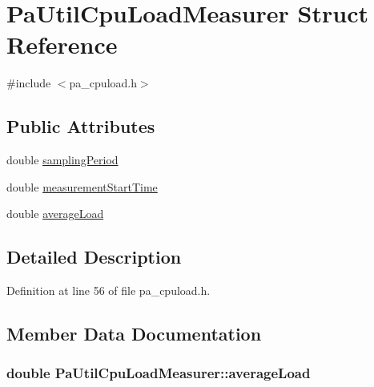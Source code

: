\hypertarget{struct_pa_util_cpu_load_measurer}{}\section{Pa\+Util\+Cpu\+Load\+Measurer Struct Reference}
\label{struct_pa_util_cpu_load_measurer}


{\ttfamily \#include $<$pa\+\_\+cpuload.\+h$>$}

\subsection*{Public Attributes}
\begin{DoxyCompactItemize}
\item 
double \hyperlink{struct_pa_util_cpu_load_measurer_a302323c24d72fb4d07c81150121484a0}{sampling\+Period}
\item 
double \hyperlink{struct_pa_util_cpu_load_measurer_add48e8254754c024b704b06cd0251b23}{measurement\+Start\+Time}
\item 
double \hyperlink{struct_pa_util_cpu_load_measurer_acca79b65aa1cce1c1dd4879bbbc79150}{average\+Load}
\end{DoxyCompactItemize}


\subsection{Detailed Description}


Definition at line 56 of file pa\+\_\+cpuload.\+h.



\subsection{Member Data Documentation}
\subsubsection[{\texorpdfstring{average\+Load}{averageLoad}}]{\setlength{\rightskip}{0pt plus 5cm}double Pa\+Util\+Cpu\+Load\+Measurer\+::average\+Load}\hypertarget{struct_pa_util_cpu_load_measurer_acca79b65aa1cce1c1dd4879bbbc79150}{}\label{struct_pa_util_cpu_load_measurer_acca79b65aa1cce1c1dd4879bbbc79150}


